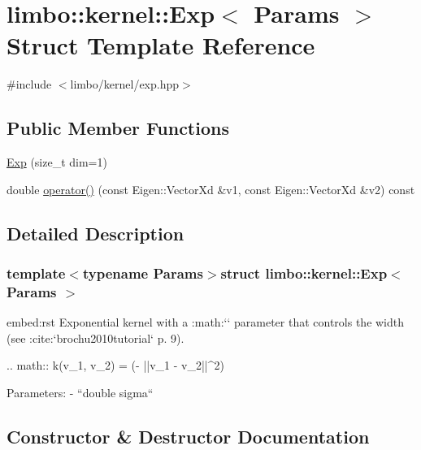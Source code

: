 \hypertarget{structlimbo_1_1kernel_1_1_exp}{}\section{limbo\+:\+:kernel\+:\+:Exp$<$ Params $>$ Struct Template Reference}
\label{structlimbo_1_1kernel_1_1_exp}


{\ttfamily \#include $<$limbo/kernel/exp.\+hpp$>$}

\subsection*{Public Member Functions}
\begin{DoxyCompactItemize}
\item 
\hyperlink{structlimbo_1_1kernel_1_1_exp_abec48720f518fa51be7f74bf102add09}{Exp} (size\+\_\+t dim=1)
\item 
double \hyperlink{structlimbo_1_1kernel_1_1_exp_a50951330db2210da72d2ea8fc9ef8b96}{operator()} (const Eigen\+::\+Vector\+Xd \&v1, const Eigen\+::\+Vector\+Xd \&v2) const 
\end{DoxyCompactItemize}


\subsection{Detailed Description}
\subsubsection*{template$<$typename Params$>$struct limbo\+::kernel\+::\+Exp$<$ Params $>$}

\begin{DoxyVerb}embed:rst
Exponential kernel with a :math:`\sigma` parameter that controls the width (see :cite:`brochu2010tutorial` p. 9).

.. math::
    k(v_1, v_2)  = \exp (- ||v_1 - v_2||^2)

Parameters:
  - ``double sigma``
\end{DoxyVerb}
 

\subsection{Constructor \& Destructor Documentation}
\hypertarget{structlimbo_1_1kernel_1_1_exp_abec48720f518fa51be7f74bf102add09}{}
